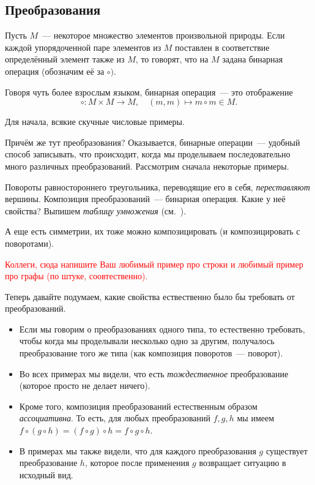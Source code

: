 
	\subsection{Преобразования}

	\begin{definition} 
		Пусть $M$~--- некоторое множество элементов произвольной природы. Если каждой упорядоченной паре элементов из $M$ поставлен в соответствие определённый элемент также из $M$, то говорят, что на $M$ задана бинарная операция (обозначим её за $\circ)$.

		Говоря чуть более взрослым языком, бинарная операция~--- это отображение 
		\[
			\circ\colon M \times M \to M, \quad (m, m) \mapsto m \circ m \in M.
		\]
	\end{definition}

	\begin{example}
		Для начала, всякие скучные числовые примеры. 
	\end{example}

	Причём же тут преобразования? Оказывается, бинарные операции~--- удобный способ записывать, что происходит, когда мы проделываем последовательно много различных преобразований.  Рассмотрим сначала некоторые примеры. 

	\begin{example}
		Повороты равностороннего треугольника, переводящие его в себя, \emph{переставляют} вершины. Композиция преобразований~--- бинарная операция. Какие у неё свойства? Выпишем \emph{таблицу умножения} (см.~\cite[пример 1]{alekseev}).

		А еще есть симметрии, их тоже можно композицировать (и композицировать с поворотами).  
	\end{example}

	\textcolor{red}{Коллеги, сюда напишите Ваш любимый пример про строки и любимый пример про графы (по штуке, соовтественно).}

	Теперь давайте подумаем, какие свойства ествественно было бы требовать от преобразований.

	\begin{itemize}
		\item Если мы говорим о преобразованиях одного типа, то естественно требовать, чтобы когда мы проделывали несколько одно за другим, получалось преобразование того же типа (как композиция поворотов~--- поворот). 

		\item Во всех примерах мы видели, что есть \emph{тождественное} преобразование (которое просто не делает ничего). 

		\item Кроме того, композиция преобразований естественным образом \emph{ассоциативна}. То есть, для любых преобразований $f, g, h$ мы имеем $f \circ (g \circ h) = (f \circ g) \circ h = f \circ g \circ h$. 

		\item В примерах мы также видели, что для каждого преобразования $g$ существует преобразование $h$, которое после применения $g$ возвращает ситуацию в исходный вид. 
	\end{itemize}


